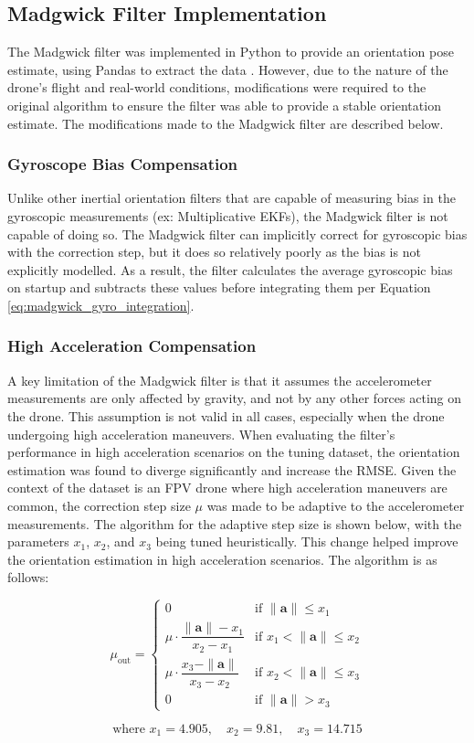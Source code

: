 \documentclass[bare_jrnl_transmag]{subfiles}
\begin{document}
\subsection{Madgwick Filter Implementation}
The Madgwick filter was implemented in Python to provide an orientation pose estimate, using Pandas to extract the data \cite{pandas}. However, due to the nature of the drone's flight and real-world conditions, modifications were required to the original algorithm to ensure the filter was able to provide a stable orientation estimate. The modifications made to the Madgwick filter are described below. \newline

\subsubsection{Gyroscope Bias Compensation}
Unlike other inertial orientation filters that are capable of measuring bias in the gyroscopic measurements (ex: Multiplicative EKFs), the Madgwick filter is not capable of doing so. The Madgwick filter can implicitly correct for gyroscopic bias with the correction step, but it does so relatively poorly as the bias is not explicitly modelled. As a result, the filter calculates the average gyroscopic bias on startup and subtracts these values before integrating them per Equation \ref{eq:madgwick_gyro_integration}. \newline

\subsubsection{High Acceleration Compensation}
A key limitation of the Madgwick filter is that it assumes the accelerometer measurements are only affected by gravity, and not by any other forces acting on the drone. This assumption is not valid in all cases, especially when the drone undergoing high acceleration maneuvers. When evaluating the filter's performance in high acceleration scenarios on the tuning dataset, the orientation estimation was found to diverge significantly and increase the RMSE. Given the context of the dataset is an FPV drone where high acceleration maneuvers are common, the correction step size $\mu$ was made to be adaptive to the accelerometer measurements. The algorithm for the adaptive step size is shown below, with the parameters $x_1$, $x_2$, and $x_3$ being tuned heuristically. This change helped improve the orientation estimation in high acceleration scenarios. The algorithm is as follows:

\[
\mu_{\text{out}} =
\begin{cases}
0 & \text{if } \|\mathbf{a}\| \leq x_1 \\
\mu \cdot \dfrac{\|\mathbf{a}\| - x_1}{x_2 - x_1} & \text{if } x_1 < \|\mathbf{a}\| \leq x_2 \\
\mu \cdot \dfrac{x_3 - \|\mathbf{a}\|}{x_3 - x_2} & \text{if } x_2 < \|\mathbf{a}\| \leq x_3 \\
0 & \text{if } \|\mathbf{a}\| > x_3
\end{cases}
\]

\[
\text{where } x_1 = 4.905, \quad x_2 = 9.81, \quad x_3 = 14.715
\]
\end{document}
